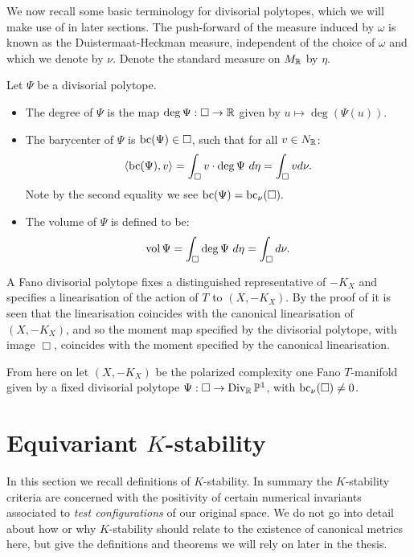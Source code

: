We now recall some basic terminology for divisorial polytopes, which we will make use of in later sections. The push-forward of the measure induced by \(\omega\) is known as the Duistermaat-Heckman measure, independent of the choice of \(\omega\) and which we denote by \(\nu\). Denote the standard measure on \(M_{\mathbb{R}}\) by \(\eta\).

\begin{definition}
Let \(\Psi\) be a divisorial polytope.
\begin{itemize}
\item The degree of \(\Psi\) is the map \( \deg \Psi : \Box \to \mathbb{R}\) given by \( u \mapsto \deg (\Psi(u))\).
\item The barycenter of \(\Psi\) is \(\mathop{\rm bc}\nolimits(\Psi) \in \Box\), such that for all \(v \in N_{\mathbb{R}}\):
\[
\langle \mathop{\rm bc}\nolimits(\Psi), v \rangle = \int_\Box v \cdot \deg \Psi \ d \eta = \int_\Box v d \nu. 
\]
Note by the second equality we see \(\mathop{\rm bc}\nolimits(\Psi) = \mathop{\rm bc}\nolimits_\nu(\Box).\)
\item The volume of \(\Psi\) is defined to be:
\[
\mathop{\rm vol}\nolimits \Psi = \int_\Box \deg \Psi \ d \eta = \int_\Box d \nu.
\]
\end{itemize}
\end{definition}

A Fano divisorial polytope fixes a distinguished representative of \(-K_X\) and specifies a linearisation of the action of \(T\) to \((X,-K_X)\). By the proof of \cite[Theorem 3.21]{petersen2011torus} it is seen that the linearisation coincides with the canonical linearisation of \((X,-K_X)\), and so the moment map specified by the divisorial polytope, with image \(\Box\), coincides with the moment specified by the canonical linearisation.

From here on let \((X,-K_X)\) be the polarized complexity one Fano \(T\)-manifold given by a fixed divisorial polytope \(\Psi: \Box \to \operatorname{Div}_{\mathbb{R}} \mathbb{P}^1\), with \(\mathop{\rm bc}\nolimits_\nu(\Box) \neq 0\).

\section{Equivariant $K$-stability}
In this section we recall definitions of \(K\)-stability. In summary the \(K\)-stability criteria are concerned with the positivity of certain numerical invariants associated to \textit{test configurations} of our original space. We do not go into detail about how or why \(K\)-stability should relate to the existence of canonical metrics here, but give the definitions and theorems we will rely on later in the thesis.
